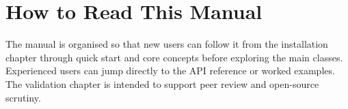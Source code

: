 \section{How to Read This Manual}

The manual is organised so that new users can follow it from the
installation chapter through quick start and core concepts before exploring
the main classes. Experienced users can jump directly to the API reference
or worked examples. The validation chapter is intended to support
peer review and open-source scrutiny.

